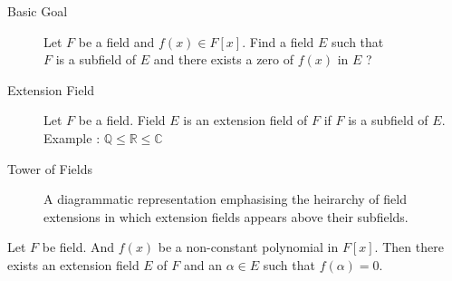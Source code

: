 \begin{description}
	\item[Basic Goal] Let $F$ be a field and $f(x) \in F[x]$.
	Find a field $E$ such that\\
	$F$ is a subfield of $E$ and there exists a zero of $f(x)$ in $E$ ?
	\item[Extension Field] Let $F$ be a field.
	Field $E$ is an extension field of $F$ if $F$ is a subfield of $E$. \\
	Example : $\mathbb{Q} \le \mathbb{R} \le \mathbb{C}$
	\item[Tower of Fields] A diagrammatic representation emphasising the heirarchy of field extensions in which extension fields appears above their subfields.
\end{description}

\begin{theorem}[Kronecker]
	Let $F$ be field.
	And $f(x)$ be a non-constant polynomial in $F[x]$.
	Then there exists an extension field $E$ of $F$ and an $\alpha \in E$ such that $f(\alpha) = 0$.
\end{theorem}
